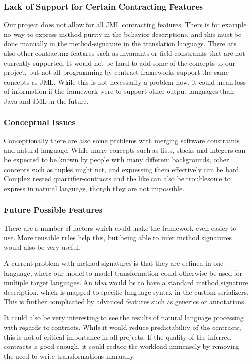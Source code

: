 \subsubsection{Lack of Support for Certain Contracting Features}
Our project does not allow for all JML contracting features.
There is for example no way to express method-purity in the behavior descriptions, and this must be done manually in the method-signature in the translation language.
There are also other contracting features such as invariants or field constraints that are not currently supported.
It would not be hard to add some of the concepts to our project, but not all programming-by-contract frameworks support the same concepts as JML.
While this is not necessarily a problem now, it could mean loss of information if the framework were to support other output-languages than Java and JML in the future.

\subsubsection{Conceptual Issues} 
Conceptionally there are also some problems with merging software constraints and natural language.
While many concepts such as lists, stacks and integers can be expected to be known by people with many different backgrounds, other concepts such as tuples might not, and expressing them effectively can be hard.
Complex nested quantifier-contracts and the like can also be troublesome to express in natural language, though they are not impossible.

\subsubsection{Future Possible Features}
There are a number of factors which could make the framework even easier to use.
More reusable rules help this, but being able to infer method signatures would also be very useful.

A current problem with method signatures is that they are defined in one language, where our model-to-model transformation could otherwise be used
for multiple target languages.
An idea would be to have a standard method signature description, which is mapped to specific language syntax in the custom serializers.
This is further complicated by advanced features such as generics or annotations.

It could also be very interesting to see the results of natural language processing with regards to contracts.
While it would reduce predictability of the contracts, this is not of critical importance in all projects.
If the quality of the inferred contracts is good enough, it could reduce the workload immensely by removing the need to write transformations manually.
